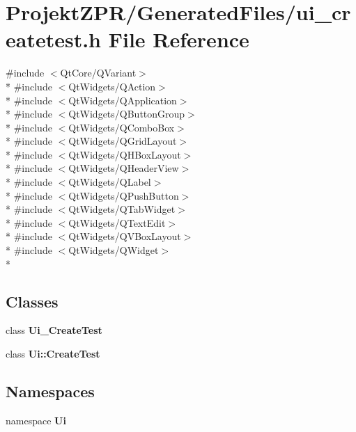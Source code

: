 \section{Projekt\-Z\-P\-R/\-Generated\-Files/ui\-\_\-createtest.h File Reference}
\label{ui__createtest_8h}
{\ttfamily \#include $<$Qt\-Core/\-Q\-Variant$>$}\\*
{\ttfamily \#include $<$Qt\-Widgets/\-Q\-Action$>$}\\*
{\ttfamily \#include $<$Qt\-Widgets/\-Q\-Application$>$}\\*
{\ttfamily \#include $<$Qt\-Widgets/\-Q\-Button\-Group$>$}\\*
{\ttfamily \#include $<$Qt\-Widgets/\-Q\-Combo\-Box$>$}\\*
{\ttfamily \#include $<$Qt\-Widgets/\-Q\-Grid\-Layout$>$}\\*
{\ttfamily \#include $<$Qt\-Widgets/\-Q\-H\-Box\-Layout$>$}\\*
{\ttfamily \#include $<$Qt\-Widgets/\-Q\-Header\-View$>$}\\*
{\ttfamily \#include $<$Qt\-Widgets/\-Q\-Label$>$}\\*
{\ttfamily \#include $<$Qt\-Widgets/\-Q\-Push\-Button$>$}\\*
{\ttfamily \#include $<$Qt\-Widgets/\-Q\-Tab\-Widget$>$}\\*
{\ttfamily \#include $<$Qt\-Widgets/\-Q\-Text\-Edit$>$}\\*
{\ttfamily \#include $<$Qt\-Widgets/\-Q\-V\-Box\-Layout$>$}\\*
{\ttfamily \#include $<$Qt\-Widgets/\-Q\-Widget$>$}\\*
\subsection*{Classes}
\begin{DoxyCompactItemize}
\item 
class {\bf Ui\-\_\-\-Create\-Test}
\item 
class {\bf Ui\-::\-Create\-Test}
\end{DoxyCompactItemize}
\subsection*{Namespaces}
\begin{DoxyCompactItemize}
\item 
namespace {\bf Ui}
\end{DoxyCompactItemize}
